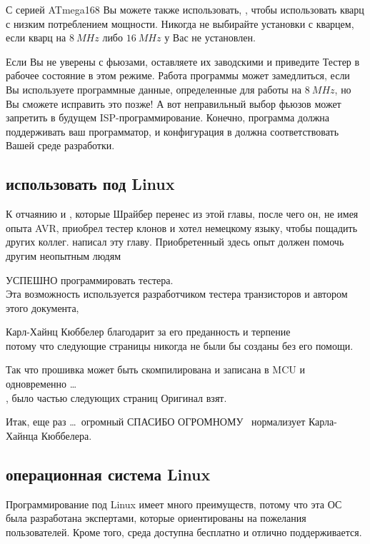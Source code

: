 С серией ATmega168 Вы можете также использовать,  , 
чтобы использовать кварц с низким потреблением мощности.
Никогда не выбирайте установки с кварцем, если кварц на \(8~MHz\) либо \(16~MHz\) у Вас не установлен.

Если Вы не уверены с фьюзами, оставляете их заводскими и приведите Тестер в рабочее 
состояние в этом режиме.
Работа программы может замедлиться, если Вы используете программные данные,
определенные для работы на \(8~MHz\), но Вы сможете исправить это позже!
А вот неправильный выбор фьюзов может запретить в будущем ISP-программирование.
Конечно, программа  должна поддерживать ваш программатор, и конфигурация в  
должна соответствовать Вашей среде разработки.\\

\subsection{использовать под Linux}
К отчаянию и , которые Шрайбер перенес из этой главы, после чего он, не имея опыта AVR, приобрел тестер клонов и хотел  немецкому языку, чтобы пощадить других коллег. написал эту главу.
Приобретенный здесь опыт должен помочь другим  неопытным людям
 
УСПЕШНО программировать тестера. \\
Эта возможность используется разработчиком тестера транзисторов и автором этого документа,

Карл-Хайнц Кюббелер благодарит \cite {karlheinz1} за его преданность и терпение \\
потому что следующие страницы никогда не были бы созданы без его помощи.
     
Так что прошивка может быть скомпилирована и записана в MCU и одновременно \dots \\
, было частью следующих страниц
Оригинал взят.

Итак, еще раз \dots \ огромный {СПАСИБО ОГРОМНОМУ}
\ нормализует Карла-Хайнца Кюббелера.
\subsection{операционная система Linux}
Программирование под Linux имеет много преимуществ, потому что эта ОС была разработана экспертами, которые ориентированы на пожелания пользователей.
Кроме того, среда доступна бесплатно и отлично поддерживается.


